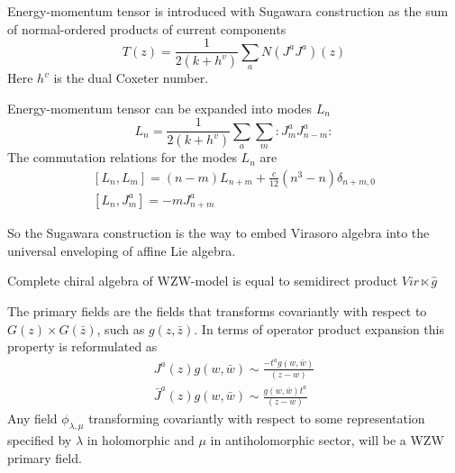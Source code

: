 \documentclass[a4paper,12pt]{article}
\theoremstyle{definition} \newtheorem{Def}{Definition}
\begin{document}
Energy-momentum tensor is introduced with Sugawara construction as the sum of normal-ordered products of current components
\begin{equation}
  \label{eq:6}
  T(z)=\frac{1}{2(k+h^v)}\sum_a N(J^a J^a)(z)
\end{equation}
Here $h^v$ is the dual Coxeter number.

Energy-momentum tensor can be expanded into modes $L_n$
\begin{equation}
  \label{eq:91}
  L_n=\frac{1}{2(k+h^v)}\sum_a\sum_m:J^a_m J^a_{n-m}:
\end{equation}
The commutation relations for the modes $L_n$ are
\begin{equation}
  \label{eq:92}
  \begin{aligned}
    \left[L_n,L_m\right]=(n-m)L_{n+m}+\frac{c}{12}(n^3-n)\delta_{n+m,0}\\
    \left[L_n,J^a_m\right]=-mJ^a_{n+m}
  \end{aligned}
\end{equation}

So the Sugawara construction is the way to embed Virasoro algebra into the universal enveloping of affine Lie algebra. 

Complete chiral algebra of WZW-model is equal to semidirect product $Vir\ltimes \hat g$

The primary fields are the fields that transforms covariantly with respect to $G(z)\times G(\bar z)$, such as $g(z,\bar z)$. In terms of operator product expansion this property is reformulated as
\begin{equation}
  \label{eq:84}
  \begin{aligned}
    J^a(z)g(w,\bar w)\sim \frac{-t^a g(w,\bar w)}{(z-w)}\\
    \bar J^a(z)g(w,\bar w)\sim \frac{ g(w,\bar w)t^a}{(z-w)}
  \end{aligned}
\end{equation}
Any field $\phi_{\lambda,\mu}$ transforming covariantly with respect to some representation specified by $\lambda$ in holomorphic and $\mu$ in antiholomorphic sector, will be a WZW primary field.
\end{document}
